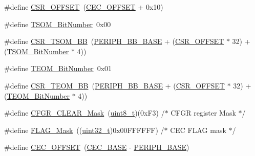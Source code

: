 \begin{DoxyCompactItemize}
\item 
\#define \hyperlink{group___c_e_c___private___defines_ga984cbe73312b6d3d355c5053763d499a}{C\+S\+R\+\_\+\+O\+F\+F\+S\+ET}~(\hyperlink{group___c_e_c___private___defines_ga675324bd8967b75f32554f50210821af}{C\+E\+C\+\_\+\+O\+F\+F\+S\+ET} + 0x10)
\item 
\#define \hyperlink{group___c_e_c___private___defines_ga1a470abab836eba7b451950938708946}{T\+S\+O\+M\+\_\+\+Bit\+Number}~0x00
\item 
\#define \hyperlink{group___c_e_c___private___defines_ga4971cc50b0ead4a493e2a9c03966c826}{C\+S\+R\+\_\+\+T\+S\+O\+M\+\_\+\+BB}~(\hyperlink{openmotestm_2library_2inc_2stm32f10x__map_8h_aed7efc100877000845c236ccdc9e144a}{P\+E\+R\+I\+P\+H\+\_\+\+B\+B\+\_\+\+B\+A\+SE} + (\hyperlink{openmotestm_2library_2src_2stm32f10x__rcc_8c_a984cbe73312b6d3d355c5053763d499a}{C\+S\+R\+\_\+\+O\+F\+F\+S\+ET} $\ast$ 32) + (\hyperlink{group___c_e_c___private___defines_ga1a470abab836eba7b451950938708946}{T\+S\+O\+M\+\_\+\+Bit\+Number} $\ast$ 4))
\item 
\#define \hyperlink{group___c_e_c___private___defines_gac86378eff7728e5cfca5480ab2dbef0b}{T\+E\+O\+M\+\_\+\+Bit\+Number}~0x01
\item 
\#define \hyperlink{group___c_e_c___private___defines_ga9ac493d98ce1f6d82b778ace0f2bc7bb}{C\+S\+R\+\_\+\+T\+E\+O\+M\+\_\+\+BB}~(\hyperlink{openmotestm_2library_2inc_2stm32f10x__map_8h_aed7efc100877000845c236ccdc9e144a}{P\+E\+R\+I\+P\+H\+\_\+\+B\+B\+\_\+\+B\+A\+SE} + (\hyperlink{openmotestm_2library_2src_2stm32f10x__rcc_8c_a984cbe73312b6d3d355c5053763d499a}{C\+S\+R\+\_\+\+O\+F\+F\+S\+ET} $\ast$ 32) + (\hyperlink{group___c_e_c___private___defines_gac86378eff7728e5cfca5480ab2dbef0b}{T\+E\+O\+M\+\_\+\+Bit\+Number} $\ast$ 4))
\item 
\#define \hyperlink{group___c_e_c___private___defines_gaaedf9b8df17534f5eaf75ec1ca3fbd7a}{C\+F\+G\+R\+\_\+\+C\+L\+E\+A\+R\+\_\+\+Mask}~(\hyperlink{_p_e___types_8h_aba7bc1797add20fe3efdf37ced1182c5}{uint8\+\_\+t})(0x\+F3)        /$\ast$ C\+F\+G\+R register Mask $\ast$/
\item 
\#define \hyperlink{group___c_e_c___private___defines_ga2be62bf481cd44de9ab604efe5595ff6}{F\+L\+A\+G\+\_\+\+Mask}~((\hyperlink{_p_e___types_8h_a33594304e786b158f3fb30289278f5af}{uint32\+\_\+t})0x00\+F\+F\+F\+F\+F\+F) /$\ast$ C\+E\+C F\+L\+A\+G mask $\ast$/
\item 
\#define \hyperlink{group___c_e_c___private___defines_ga675324bd8967b75f32554f50210821af}{C\+E\+C\+\_\+\+O\+F\+F\+S\+ET}~(\hyperlink{group___peripheral__memory__map_gaacb77bc44b3f8c87ab98f241e760e440}{C\+E\+C\+\_\+\+B\+A\+SE} -\/ \hyperlink{openmotestm_2library_2inc_2stm32f10x__map_8h_a9171f49478fa86d932f89e78e73b88b0}{P\+E\+R\+I\+P\+H\+\_\+\+B\+A\+SE})

\end{DoxyCompactItemize}
